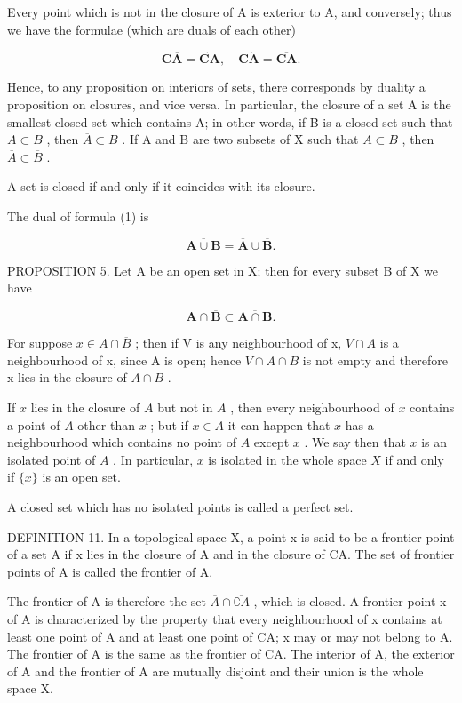 Every point which is not in the closure of A is exterior to A, and conversely; thus we have the formulae (which are duals of each other)

\[
\mathbf {C} \overline {{\mathbf {A}}} = \mathring {\mathbf {C} \mathbf {A}}, \quad \mathbf {C} \mathring {\mathbf {A}} = \overline {{\mathbf {C} \mathbf {A}}}.\tag{2}
\]

Hence, to any proposition on interiors of sets, there corresponds by duality a proposition on closures, and vice versa. In particular, the closure of a set A is the smallest closed set which contains A; in other words, if B is a closed set such that \(A \subset B\) , then \(\overline{A} \subset B\) . If A and B are two subsets of X such that \(A \subset B\) , then \(\overline{A} \subset \overline{B}\) .

A set is closed if and only if it coincides with its closure.

The dual of formula (1) is

\[
\overline {{{\mathbf {A} \cup \mathbf {B}}}} = \overline {{{\mathbf {A}}}} \cup \overline {{{\mathbf {B}}}}.\tag{3}
\]

PROPOSITION 5. Let A be an open set in X; then for every subset B of X we have

\[
\mathbf {A} \cap \overline {{\mathbf {B}}} \subset \overline {{\mathbf {A} \cap \mathbf {B}}}.\tag{4}
\]

For suppose \(x \in A \cap \overline{B}\) ; then if V is any neighbourhood of x, \(V \cap A\) is a neighbourhood of x, since A is open; hence \(V \cap A \cap B\) is not empty and therefore x lies in the closure of \(A \cap B\) .

If \(x\) lies in the closure of \(A\) but not in \(A\) , then every neighbourhood of \(x\) contains a point of \(A\) other than \(x\) ; but if \(x \in A\) it can happen that \(x\) has a neighbourhood which contains no point of \(A\) except \(x\) . We say then that \(x\) is an isolated point of \(A\) . In particular, \(x\) is isolated in the whole space \(X\) if and only if \(\{x\}\) is an open set.

A closed set which has no isolated points is called a perfect set.

DEFINITION 11. In a topological space X, a point x is said to be a frontier point of a set A if x lies in the closure of A and in the closure of CA. The set of frontier points of A is called the frontier of A.

The frontier of A is therefore the set \(\overline{A} \cap \overline{\complement A}\) , which is closed. A frontier point x of A is characterized by the property that every neighbourhood of x contains at least one point of A and at least one point of CA; x may or may not belong to A. The frontier of A is the same as the frontier of CA. The interior of A, the exterior of A and the frontier of A are mutually disjoint and their union is the whole space X.

